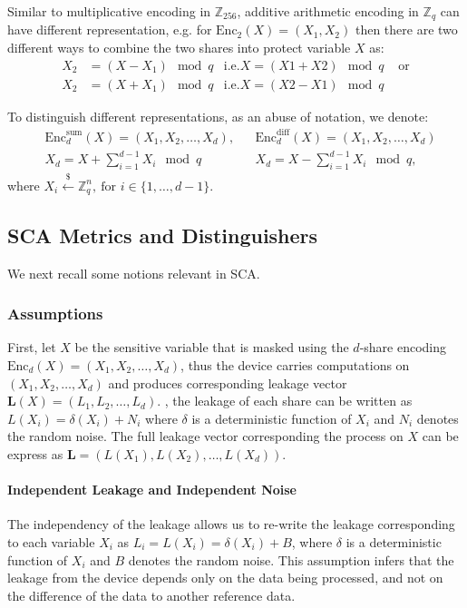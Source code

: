 \documentclass{llncs}
\begin{document}
Similar to multiplicative encoding in $\mathbb{Z}_{256}$, additive arithmetic encoding in $\mathbb{Z}_q$ can have different representation, e.g. for $\text{Enc}_{2}(X) = (X_1, X_2)$ then there are two different ways to combine the two shares into protect variable $X$ as:
\begin{align*}
	X_2 &= (X - X_1) \mod q & \text{i.e.} X = (X1 + X2)\mod q & \text{ or}\\
	X_2 &= (X + X_1) \mod q & \text{i.e.} X = (X2 - X1)\mod q
\end{align*}

To distinguish different representations, as an abuse of notation, we denote:
\begin{align*}
	&\text{Enc}^{\text{sum}}_{d}(X) = (X_1, X_2, \dots, X_d)   ,  &  &\text{Enc}^{\text{diff}}_{d}(X) = (X_1, X_2, \dots, X_d) \\
	&X_d = X + \sum_{i =1}^{d-1}X_i \mod q    &  &X_d = X - \sum_{i =1}^{d-1}X_i \mod q ,
\end{align*}
where $X_i \overset{\$}{\leftarrow} \mathbb{Z}_q^n,\ \text{for } i \in \{1, \dots, d-1\}$.
\subsection*{SCA Metrics and Distinguishers}
We next recall some notions relevant in SCA.
\subsubsection*{Assumptions}
First, let $X$ be the sensitive variable that is masked using the $d$-share encoding $\text{Enc}_d(X) = (X_1, X_2, \dots, X_d)$, thus the device carries computations on $(X_1, X_2, \dots, X_d)$ and produces corresponding leakage vector $\bm{L}(X) = (L_1, L_2, \dots, L_d)$.
, the leakage of each share can be written as $L(X_i) = \delta(X_i) + N_i$ where $\delta$ is a deterministic function of $X_i$ and $N_i$ denotes the random noise. The full leakage vector corresponding the process on $X$ can be express as $\mathbf{L} = (L(X_1), L(X_2), \dots, L(X_d))$.
\paragraph{Independent Leakage and Independent Noise}
The independency of the leakage allows us to re-write the leakage corresponding to each variable $X_i$ as $L_i = L(X_i) = \delta(X_i) + B$, where $\delta$ is a deterministic function of $X_i$ and $B$ denotes the random noise. This assumption infers that the leakage from the device depends only on the data being processed, and not on the difference of the data to another reference data.
\end{document}
